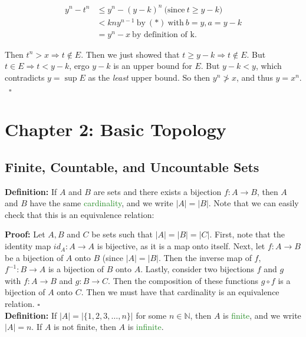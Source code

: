 \documentclass{article}
\begin{document}
\begin{align*}
    y^n-t^n &\leq y^n-(y-k)^n \ \text{(since} \ t\geq y-k)\\ 
    &< kny^{n-1} \ \text{by} \ (*) \ \text{with} \ b=y, a=y-k\\ 
    &=y^n-x \ \text{by definition of k}.
\end{align*}

Then $t^n>x \Longrightarrow t \notin E$. Then we just showed that $t \geq y-k \Longrightarrow t \notin E$. But $t \in E \Longrightarrow t < y-k$, ergo $y-k$ is an upper bound for $E$. But $y-k<y$, which contradicts $y=\sup{E}$ as the \textit{least} upper bound. So then $y^n \not> x$, and thus $y=x^n$. \ $\square$

\newpage

\section*{Chapter 2: Basic Topology}
\setcounter{section}{2}
\setcounter{subsection}{0}
\subsection{Finite, Countable, and Uncountable Sets}

\textbf{Definition:} If $A$ and $B$ are sets and there exists a bijection $f:A \longrightarrow B$, then $A$ and $B$ have the same \textcolor{ForestGreen}{cardinality}, and we write $|A|=|B|$. Note that we can easily check that this is an equivalence relation:

\textbf{Proof:} Let $A,B$ and $C$ be sets such that $|A|=|B|=|C|$. First, note that the identity map $id_A:A \longrightarrow A$ is bijective, as it is a map onto itself. Next, let $f:A \longrightarrow B$ be a bijection of $A$ onto $B$ (since $|A|=|B|$. Then the inverse map of $f$, $f^{-1}:B \longrightarrow A$ is a bijection of $B$ onto $A$. Lastly, consider two bijections $f$ and $g$ with $f: A \longrightarrow B$ and $g: B \longrightarrow C$. Then the composition of these functions $g \circ f$ is a bijection of $A$ onto $C$. Then we must have that cardinality is an equivalence relation. $\square$\\

\textbf{Definition:} If $|A|=|\{1,2,3, \dots,n\}|$ for some $n \in \mathbb{N}$, then $A$ is \textcolor{ForestGreen}{finite}, and we write $|A|=n$. If $A$ is not finite, then $A$ is \textcolor{ForestGreen}{infinite}.\\
\end{document}
